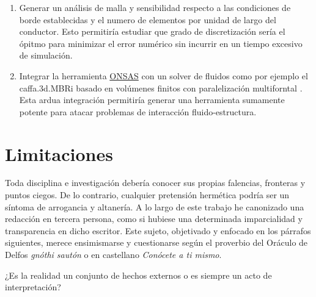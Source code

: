 \begin{enumerate}
	\item Generar un análisis de malla y sensibilidad respecto a las condiciones de borde establecidas y el numero de elementos por unidad de largo del conductor. Esto permitiría estudiar que grado de discretización sería el ópitmo para minimizar el error numérico sin incurrir en un tiempo excesivo de simulación. 
	\item Integrar la herramienta \href{https://github.com/ONSAS/ONSAS/}{ONSAS} con un solver de fluidos como por ejemplo el caffa.3d.MBRi basado en volúmenes finitos con paralelización multiforntal \cite{mendina2014general}. Esta ardua integración permitiría generar una herramienta sumamente potente para atacar problemas de interacción fluido-estructura.	
\end{enumerate}

\section{Limitaciones }

Toda disciplina e investigación debería conocer sus propias falencias, fronteras y puntos ciegos. De lo contrario, cualquier pretensión hermética podría ser un síntoma de arrogancia y altanería.  A lo largo de este trabajo he canonizado una redacción en tercera persona, como si hubiese una determinada imparcialidad y transparencia en dicho escritor. Este sujeto, objetivado y enfocado en los párrafos siguientes, merece ensimismarse y cuestionarse según el proverbio del Oráculo de Delfos \emph{gnóthi sautón} o en castellano  \emph{Conócete a ti mismo}.

¿Es la realidad un conjunto de hechos externos o es siempre un acto de interpretación? 

